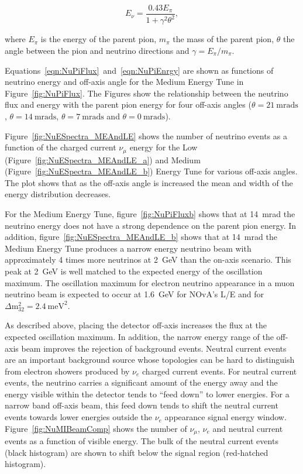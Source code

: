 \begin{equation}
E_{\nu} = \dfrac{0.43E_{\pi}}{1+\gamma^2\theta^2},
\label{eqn:NuPiEnrgy}
\end{equation}

\noindent where $E_{\pi}$ is the energy of the parent pion, $m_{\pi}$ the mass of the
parent pion, $\theta$ the angle between the pion and neutrino
directions and $\gamma = E_{\pi}/m_{\pi}$.

Equations~\ref{eqn:NuPiFlux}~and~\ref{eqn:NuPiEnrgy} are shown as 
functions of neutrino energy and off-axis angle for the Medium Energy
Tune in Figure~\ref{fig:NuPiFlux}. The Figures show the relationship
between the neutrino flux and energy with the parent pion energy for
four off-axis angles ($\theta = 21~\text{mrads}$, $\theta =
14~\text{mrads}$, $\theta = 7~\text{mrads}$ and $\theta =
0~\text{mrads}$). 

Figure~\ref{fig:NuESpectra_MEAndLE} shows the number of neutrino
events as a function of the
charged current $\nu_{\mu}$ energy for the Low
(Figure~\ref{fig:NuESpectra_MEAndLE_a}) and 
Medium (Figure~\ref{fig:NuESpectra_MEAndLE_b}) Energy Tune for various
off-axis angles. The plot shows that as the off-axis angle is
increased the mean and width of the energy distribution decreases.


For the Medium Energy Tune, figure~\ref{fig:NuPiFluxb} shows that at
14~mrad the neutrino energy
does not have a strong dependence on the parent pion energy.
In addition, figure~\ref{fig:NuESpectra_MEAndLE_b} shows that at
14~mrad the Medium
Energy Tune produces a narrow energy neutrino beam with approximately
4 times more neutrinos at 2~GeV than the on-axis scenario. This peak at
2~GeV is well matched to the expected energy of the oscillation
maximum. The oscillation maximum for electron neutrino appearance in a
muon neutrino beam is expected to occur at 1.6~GeV for
NOvA's L/E and for $\Delta \textrm{m}_{32}^2=2.4~\textrm{meV}^2$.

As described above, placing the detector off-axis increases the flux
at the expected oscillation maximum. In addition, the narrow energy
range of the off-axis beam improves the rejection of background
events. Neutral current events are an important background source
whose topologies can be hard to distinguish from electron showers
produced by $\nu_e$ charged current events. For neutral current events, the neutrino carries a
significant amount of the energy away and the energy visible within
the detector tends to
``feed down'' to lower energies. For a narrow band off-axis beam, this
feed down tends to shift the neutral current events towards lower energies
outside the $\nu_e$ appearance signal energy
window. Figure~\ref{fig:NuMIBeamComp} 
shows the number of $\nu_{\mu}$, $\nu_e$ and neutral current events as a function
of visible energy. The bulk of the neutral current events (black histogram) are
shown to shift below the signal region (red-hatched histogram).


